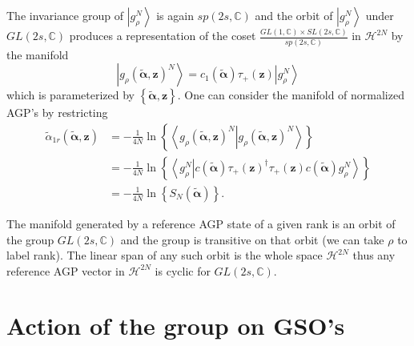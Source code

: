 \documentclass[aps,preprint]{revtex4}%
\begin{document}
The invariance group of $\left\vert g_{\rho}^{N}\right\rangle $ is again
$sp\left(  2s,\mathbb{C}\right)  $ and the orbit of $\left\vert g_{\rho}%
^{N}\right\rangle $ under $GL\left(  2s,\mathbb{C}\right)  $ produces a
representation of the coset $\frac{GL\left(  1,\mathbb{C}\right)  \times
SL\left(  2s,\mathbb{C}\right)  }{sp\left(  2s,\mathbb{C}\right)  }$ in
$\mathcal{H}^{2N}$ by the manifold
\begin{equation}
\left\vert g_{\rho}\left(  \mathbf{\tilde{\alpha},z}\right)  ^{N}\right\rangle
=c_{1}\left(  \mathbf{\tilde{\alpha}}\right)  \tau_{+}\left(  \mathbf{z}%
\right)  \left\vert g_{\rho}^{N}\right\rangle
\end{equation}
which is parameterized by $\left\{  \mathbf{\tilde{\alpha},z}\right\}  .$ One
can consider the manifold of normalized AGP's by restricting%
\begin{align}
\tilde{\alpha}_{1r}\left(  \mathbf{\tilde{\alpha},z}\right)   &  =-\frac
{1}{4N}\ln\left\{  \left\langle g_{\rho}\left(  \mathbf{\tilde{\alpha}%
,z}\right)  ^{N}\left\vert g_{\rho}\left(  \mathbf{\tilde{\alpha},z}\right)
^{N}\right.  \right\rangle \right\} \nonumber\\
&  =-\frac{1}{4N}\ln\left\{  \left\langle g_{\rho}^{N}\left\vert c\left(
\mathbf{\tilde{\alpha}}\right)  \tau_{+}\left(  \mathbf{z}\right)  ^{\dagger
}\tau_{+}\left(  \mathbf{z}\right)  c\left(  \mathbf{\tilde{\alpha}}\right)
g_{\rho}^{N}\right.  \right\rangle \right\} \nonumber\\
&  =-\frac{1}{4N}\ln\left\{  S_{N}\left(  \mathbf{\tilde{\alpha}}\right)
\right\}  .
\end{align}


The manifold generated by a reference AGP state of a given rank is an orbit of
the group $GL\left(  2s,\mathbb{C}\right)  $ and the group is transitive on
that orbit (we can take $\rho$ to label rank). The linear span of any such
orbit is the whole space $\mathcal{H}^{2N}$ thus any reference AGP vector in
$\mathcal{H}^{2N}$ is cyclic for $GL\left(  2s,\mathbb{C}\right)  $.

\section{Action of the group on GSO's}%
\end{document}
